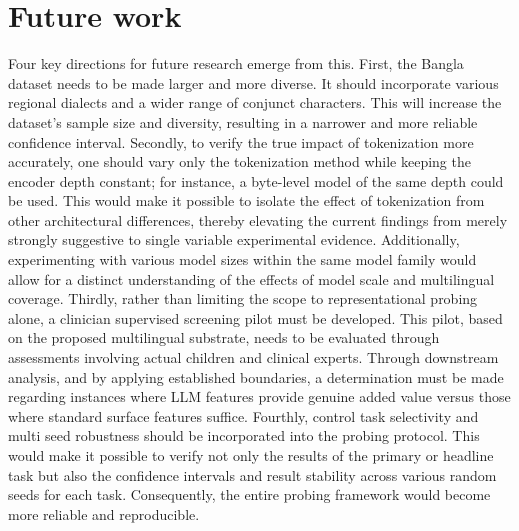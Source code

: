 \documentclass[preprint,12pt,authoryear]{elsarticle}
\begin{document}
\section{Future work}
\label{sec:future}
Four key directions for future research emerge from this. First, the Bangla dataset needs to be made larger and more diverse. It should incorporate various regional dialects and a wider range of conjunct characters. This will increase the dataset's sample size and diversity, resulting in a narrower and more reliable confidence interval. Secondly, to verify the true impact of tokenization more accurately, one should vary only the tokenization method while keeping the encoder depth constant; for instance, a byte-level model of the same depth could be used. This would make it possible to isolate the effect of tokenization from other architectural differences, thereby elevating the current findings from merely strongly suggestive to single variable experimental evidence. Additionally, experimenting with various model sizes within the same model family would allow for a distinct understanding of the effects of model scale and multilingual coverage. Thirdly, rather than limiting the scope to representational probing alone, a clinician supervised screening pilot must be developed. This pilot, based on the proposed multilingual substrate, needs to be evaluated through assessments involving actual children and clinical experts. Through downstream analysis, and by applying established boundaries, a determination must be made regarding instances where LLM features provide genuine added value versus those where standard surface features suffice. Fourthly, control task selectivity and multi seed robustness should be incorporated into the probing protocol. This would make it possible to verify not only the results of the primary or headline task but also the confidence intervals and result stability across various random seeds for each task. Consequently, the entire probing framework would become more reliable and reproducible.

\end{document}
